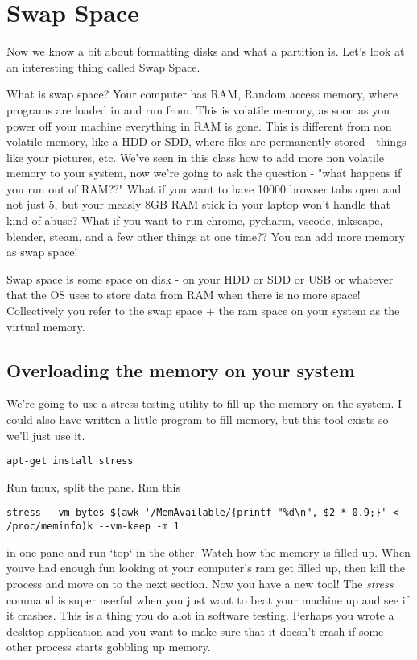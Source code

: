 \documentclass[10pt]{article}
\begin{document}
\section{Swap Space}

Now we know a bit about formatting disks and what a partition is. Let's look at an interesting thing called Swap Space.


What is swap space? Your computer has RAM, Random access memory, where programs are loaded in and run from. This is volatile memory, as soon as you power off your machine everything in RAM is gone. This is different from non volatile memory, like a HDD or SDD, where files are permanently stored - things like your pictures, etc. We've seen in this class how to add more non volatile memory to your system, now we're going to ask the question - "what happens if you run out of RAM??" What if you want to have 10000 browser tabs open and not just 5, but your measly 8GB RAM stick in your laptop won't handle that kind of abuse? What if you want to run chrome, pycharm, vscode, inkscape, blender, steam, and a few other things at one time?? You can add more memory as swap space!

Swap space is some space on disk - on your HDD or SDD or USB or whatever that the OS uses to store data from RAM when  there is no more space! Collectively you refer to the swap space + the ram space on your system as the virtual memory.

\subsection{Overloading the memory on your system}
We're going to use a stress testing utility to fill up the memory on the system. I could also have written a little program to fill memory, but this tool exists so we'll just use it. 
\begin{lstlisting}
apt-get install stress
\end{lstlisting}

Run tmux, split the pane. Run this 

\begin{lstlisting}
stress --vm-bytes $(awk '/MemAvailable/{printf "%d\n", $2 * 0.9;}' < /proc/meminfo)k --vm-keep -m 1
\end{lstlisting}

in one pane and run `top` in the other. Watch how the memory is filled up. When youve had enough fun looking at your computer's ram get filled up, then kill the process and move on to the next section. Now you have a new tool! The \textit{stress} command is super userful when you just want to beat your machine up and see if it crashes. This is a thing you do alot in software testing. Perhaps you wrote a desktop application and you want to make sure that it doesn't crash if some other process starts gobbling up memory.
\end{document}
